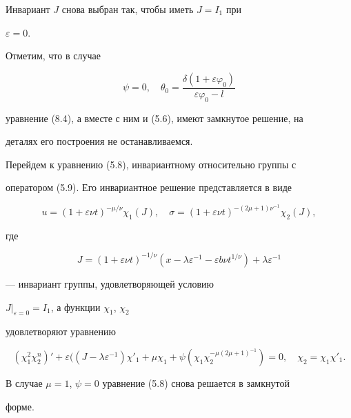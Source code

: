 Инвариант $J$ снова выбран так, чтобы иметь $J=I_1$ при


$\varepsilon=0$.


Отметим, что в случае


$$


\psi=0,\quad \theta_0=


\frac{\delta(1+\varepsilon\varphi_0)}{\varepsilon\varphi_0-l}


$$


уравнение (8.4), а вместе с ним и (5.6), имеют замкнутое решение, на


деталях его построения не останавливаемся.





Перейдем к уравнению (5.8), инвариантному относительно группы с


оператором (5.9). Его инвариантное решение представляется в виде


\begin{equation}


u=(1+\varepsilon\nu t)^{-\mu/\nu}\chi_1(J),\quad


\sigma=(1+\varepsilon\nu t)^{-(2\mu+1)\nu^{-1}}\chi_2(J),


\end{equation}


где


$$


J=(1+\varepsilon\nu t)^{-1/\nu}(x-\lambda\varepsilon^{-1}-


\varepsilon b\nu t^{1/\nu})+\lambda\varepsilon^{-1}


$$


--- инвариант группы, удовлетворяющей условию


$J|_{\varepsilon=0}=I_1$, а функции $\chi_1$, $\chi_2$


удовлетворяют уравнению


\begin{equation}


(\chi^2_1\chi^n_2)'+\varepsilon((J-\lambda\varepsilon^{-1})\chi'_1+


\mu\chi_1+\psi(\chi_1\chi_2^{-\mu(2\mu+1)^{-1}})=0,\quad


\chi_2=\chi_1\chi'_1.


\end{equation}


В случае $\mu=1$, $\psi=0$ уравнение (5.8) снова решается в замкнутой


форме.





